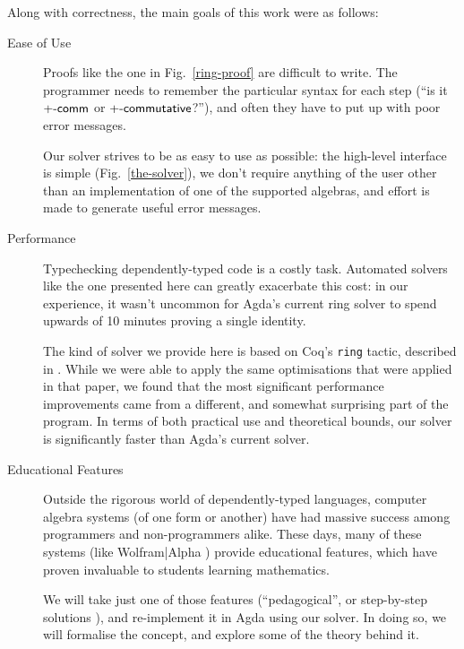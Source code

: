 \documentclass[acmsmall, screen, nonacm, timestamp, review]{acmart}
\theoremstyle{definition}
\theoremstyle{definition}
\begin{document}
Along with correctness, the main goals of this work were as follows:
\begin{description}
  \item[Ease of Use] Proofs like the one in Fig.~\ref{ring-proof} are difficult
    to write. The programmer needs to remember the particular syntax for each
    step (``is it \(\AgdaFunction{+-comm}\) or
    \(\AgdaFunction{+-commutative}\)?''), and often they have to put up with
    poor error messages.

    Our solver strives to be as easy to use as possible: the high-level
    interface is simple (Fig.~\ref{the-solver}), we don't require anything
    of the user other than an implementation of one of the supported algebras,
    and effort is made to generate useful error messages.
  \item[Performance] Typechecking dependently-typed code is a costly task.
    Automated solvers like the one presented here can greatly exacerbate this
    cost: in our experience, it wasn't uncommon for Agda's current ring solver
    to spend upwards of 10 minutes proving a single identity.

    The kind of solver we provide here is based on Coq's
    \cite{the_coq_development_team_2018_1219885} \verb+ring+ tactic, described
    in \citet{gregoire_proving_2005}. While we were able to apply the same
    optimisations that were applied in that paper, we found that the most
    significant performance improvements came from a different, and somewhat
    surprising part of the program. In terms of both practical use and
    theoretical bounds, our solver is significantly faster than Agda's current
    solver.
  \item[Educational Features] Outside the rigorous world of dependently-typed
    languages, computer algebra systems (of one form or another) have had
    massive success among programmers and non-programmers alike. These days,
    many of these systems (like Wolfram|Alpha
    \cite{wolfram_research_inc._wolframalpha_2019}) provide educational
    features, which have proven invaluable to students learning mathematics.

    We will take just one of those features (``pedagogical'', or step-by-step
    solutions \cite{the_development_team_step-by-step_2009}), and re-implement
    it in Agda using our solver. In doing so, we will formalise the concept, and
    explore some of the theory behind it. 
\end{description}
\end{document}
